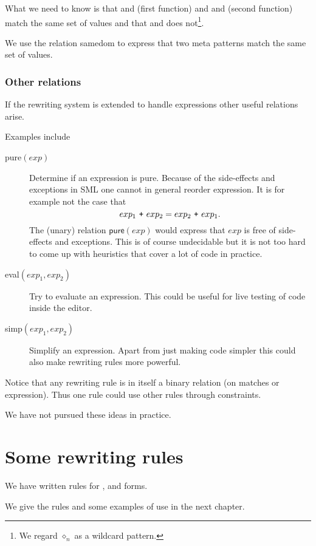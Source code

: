 What we need to know is that  and \ttt{_} (first
function) and \mbox{} and \mbox{}
(second function) match the same set of values and that
\mbox{} and \ttt{_} does not\footnote{We regard
  $\diamond_n$ as a wildcard pattern.}.

We use the relation \textsf{samedom} to express that two meta patterns match the
same set of values.

\subsubsection{Other relations}
If the rewriting system is extended to handle expressions other useful relations
arise.

Examples include
\begin{description}
\item[\textsf{pure}$(exp)$] Determine if an expression is pure. Because of the
  side-effects and exceptions in SML one cannot in general reorder
  expression. It is for example not the case that
  \[
  exp_1\ \ttt{+}\ exp_2 = exp_2\ \ttt{+}\ exp_1.
  \]
  The (unary) relation $\textsf{pure}(exp)$ would express that $exp$ is free of
  side-effects and exceptions. This is of course undecidable but it is not too
  hard to come up with heuristics that cover a lot of code in practice.
\item[\textsf{eval}$(exp_1, exp_2)$] Try to evaluate an expression. This could be
  useful for live testing of code inside the editor.
\item[\textsf{simp}$(exp_1, exp_2)$] Simplify an expression. Apart from just
  making code simpler this could also make rewriting rules more powerful.
\end{description}

Notice that any rewriting rule is in itself a binary relation (on matches or
expression). Thus one rule could use other rules through constraints.

We have not pursued these ideas in practice.

\section{Some rewriting rules}
We have written rules for ,  and  forms.

We give the rules and some examples of use in the next chapter.


